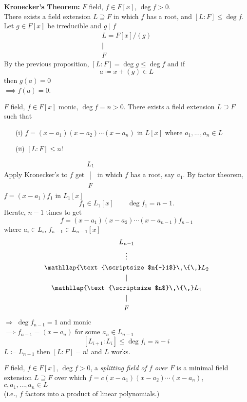 \textbf{Kronecker's Theorem: }$F$ field, $f\in F[x]$, $\deg f>0$. \\
There exists a field extension $L\supseteq F$ in which $f$ has a root, and $[L:F]\leq\deg f$. \\
\pf Let $g\in F[x]$ be irreducible and $g\mid f$
\begin{gather*}
L = F[x]/(g) \\
| \\
F
\end{gather*}
By the previous proposition, $[L:F]=\deg g\leq\deg f$ and if
\[ a \coloneqq x + (g) \in L \]
then $g(a)=0$ \\
$\implies f(a)=0$.

\cor $F$ field, $f\in F[x]$ monic, $\deg f=n>0$.  There exists a field extension $L\supseteq F$ such that
\begin{enumerate}
\item[(i)] $f=(x-a_1)(x-a_2)\dotsm(x-a_n)$ in $L[x]$ where $a_1,\dotsc,a_n\in L$
\item[(ii)] $[L:F]\leq n!$
\end{enumerate}
\pf Apply Kronecker's to $f$ get {\scriptsize$\begin{gathered}L_1\\\bigm|\\F\end{gathered}$} in which $f$ has a root, say $a_1$.  By factor theorem, $f=(x-a_1)f_1$ in $L_1[x]$
\[ f_1 \in L_1[x] \qquad \deg f_1 = n-1 . \]
Iterate, $n-1$ times to get
\[ f = (x-a_1)(x-a_2)\dotsm(x-a_{n-1})f_{n-1} \]
where $a_i\in L_i$, $f_{n-1}\in L_{n-1}[x]$
\begin{gather*}
L_{n-1} \\
\vdots \\
\mathllap{\text{\scriptsize$n{-}1$}\,\{\,} L_2 \\
| \\
\mathllap{\text{\scriptsize$n$}\,\{\,} L_1 \\
| \\
F
\end{gather*}
$\Longrightarrow\; \deg f_{n-1}=1$ and monic \\
$\implies f_{n-1}=(x-a_n)$ for some $a_n\in L_{n-1}$
\[ [L_{i+1}:L_i] \leq \deg f_i = n-i \]
$L\coloneqq L_{n-1}$ then $[L:F]=n!$ and $L$ works.

 $F$ field, $f\in F[x]$, $\deg f>0$, a \emph{splitting field of $f$ over $F$} is a minimal field extension $L\supseteq F$ over which $f=c(x-a_1)(x-a_2)\dotsm(x-a_n)$, $c,a_1,\dotsc,a_n\in L$ \\
(i.e., $f$ factors into a product of linear polynomials.)

